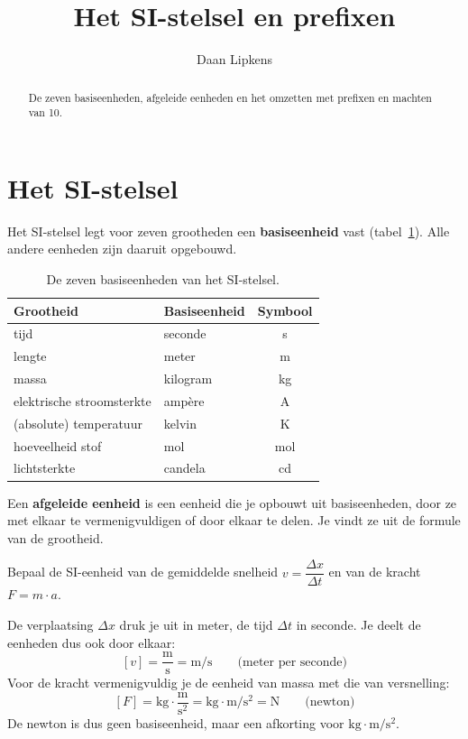\documentclass{ximera}
\title{Het SI-stelsel en prefixen}
\author{Daan Lipkens}
\begin{document}
\begin{abstract}
    De zeven basiseenheden, afgeleide eenheden en het omzetten met prefixen en machten van 10.
\end{abstract}
\maketitle

\section{Het SI-stelsel}\label{sec:si_stelsel}
Het SI-stelsel legt voor zeven grootheden een \textbf{basiseenheid} vast (tabel~\ref{tab:si_basiseenheden}). Alle andere eenheden zijn daaruit opgebouwd.

\begin{table}[h]
    \centering
    \begin{tabular}{|l|l|c|}
        \hline
        \textbf{Grootheid} & \textbf{Basiseenheid} & \textbf{Symbool} \\
        \hline
        tijd & seconde & s \\
        lengte & meter & m \\
        massa & kilogram & kg \\
        elektrische stroomsterkte & ampère & A \\
        (absolute) temperatuur & kelvin & K \\
        hoeveelheid stof & mol & mol \\
        lichtsterkte & candela & cd \\
        \hline
    \end{tabular}
    \caption{De zeven basiseenheden van het SI-stelsel.}
    \label{tab:si_basiseenheden}
\end{table}

\begin{definition}[title={Afgeleide eenheid}]\nl
    Een \textbf{afgeleide eenheid} is een eenheid die je opbouwt uit basiseenheden, door ze met elkaar te vermenigvuldigen of door elkaar te delen. Je vindt ze uit de formule van de grootheid.
\end{definition}

\begin{example}[foldable=true,title={Voorbeeld: de eenheid van snelheid en van kracht}]\nl
    Bepaal de SI-eenheid van de gemiddelde snelheid $v = \dfrac{\Delta x}{\Delta t}$ en van de kracht $F = m \cdot a$.

    \begin{solution}\nl
        De verplaatsing $\Delta x$ druk je uit in meter, de tijd $\Delta t$ in seconde. Je deelt de eenheden dus ook door elkaar:
        \[ [v] = \frac{\mathrm{m}}{\mathrm{s}} = \mathrm{m/s} \qquad \text{(meter per seconde)} \]
        Voor de kracht vermenigvuldig je de eenheid van massa met die van versnelling:
        \[ [F] = \mathrm{kg} \cdot \frac{\mathrm{m}}{\mathrm{s^2}} = \mathrm{kg \cdot m/s^2} = \mathrm{N} \qquad \text{(newton)} \]
        De newton is dus geen basiseenheid, maar een afkorting voor $\mathrm{kg \cdot m/s^2}$.
    \end{solution}
\end{example}
\end{document}
